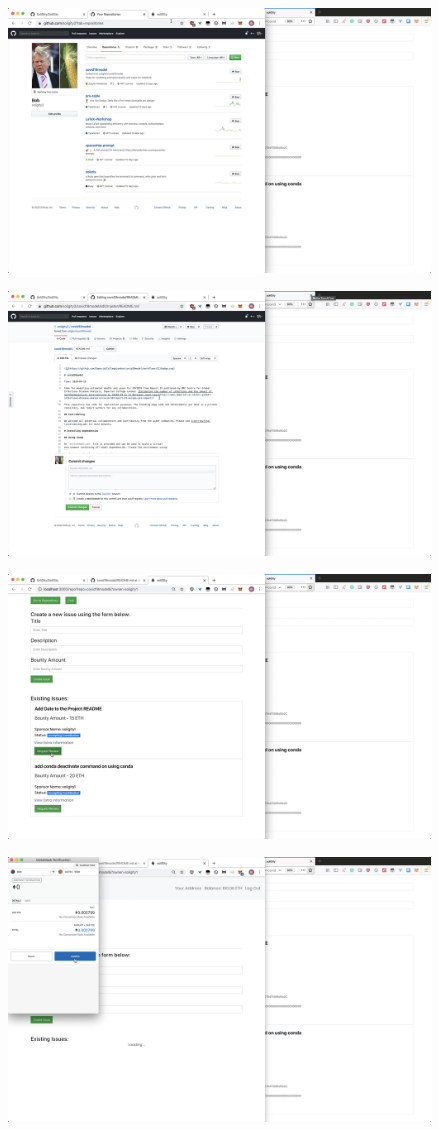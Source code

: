 \documentclass[12pt]{article}
\renewcommand{\_}{\kern-1.5pt\textunderscore\kern-1.5pt}
\begin{document}
\includegraphics[height=7cm]{graphs/32. bob_forked_github}

\includegraphics[height=7cm]{graphs/33. bob_make_changes}

\includegraphics[height=7cm]{graphs/34. bob_review_request}

\includegraphics[height=7cm]{graphs/35. bob_review_request_metamask}
\end{document}
